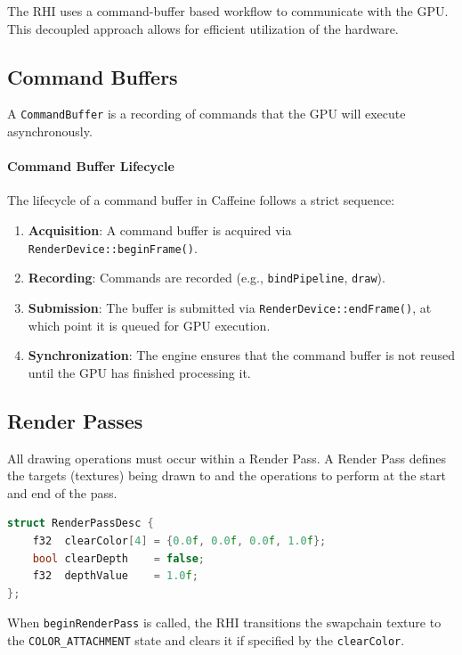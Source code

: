 The RHI uses a command-buffer based workflow to communicate with the GPU. This decoupled approach allows for efficient utilization of the hardware.

\subsection{Command Buffers}

A \texttt{CommandBuffer} is a recording of commands that the GPU will execute asynchronously.


\paragraph{Command Buffer Lifecycle}

The lifecycle of a command buffer in Caffeine follows a strict sequence:
\begin{enumerate}
    \item \textbf{Acquisition}: A command buffer is acquired via \texttt{RenderDevice::beginFrame()}.
    \item \textbf{Recording}: Commands are recorded (e.g., \texttt{bindPipeline}, \texttt{draw}).
    \item \textbf{Submission}: The buffer is submitted via \texttt{RenderDevice::endFrame()}, at which point it is queued for GPU execution.
    \item \textbf{Synchronization}: The engine ensures that the command buffer is not reused until the GPU has finished processing it.
\end{enumerate}



\subsection{Render Passes}

All drawing operations must occur within a Render Pass. A Render Pass defines the targets (textures) being drawn to and the operations to perform at the start and end of the pass.

\begin{lstlisting}[language=C++]
struct RenderPassDesc {
    f32  clearColor[4] = {0.0f, 0.0f, 0.0f, 1.0f};
    bool clearDepth    = false;
    f32  depthValue    = 1.0f;
};
\end{lstlisting}

When \texttt{beginRenderPass} is called, the RHI transitions the swapchain texture to the \texttt{COLOR\_ATTACHMENT} state and clears it if specified by the \texttt{clearColor}.

